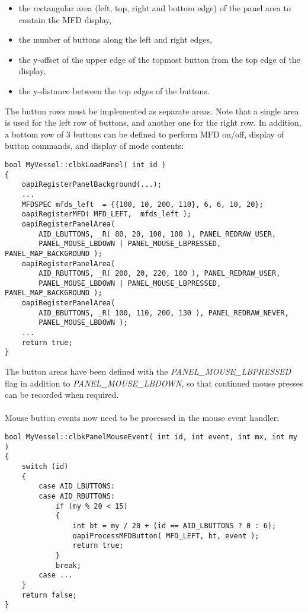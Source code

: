 \documentclass[Orbiter Developer Manual.tex]{subfiles}
\begin{document}
\begin{itemize}
\item the rectangular area (left, top, right and bottom edge) of the panel area to contain the MFD display,
\item the number of buttons along the left and right edges,
\item the y-offset of the upper edge of the topmost button from the top edge of the display,
\item the y-distance between the top edges of the buttons.
\end{itemize}

\noindent
The button rows must be implemented as separate areas. Note that a single area is used for the left row of buttons, and another one for the right row. In addition, a bottom row of 3 buttons can be defined to perform MFD on/off, display of button commands, and display of mode contents:

\begin{lstlisting}
bool MyVessel::clbkLoadPanel( int id )
{
	oapiRegisterPanelBackground(...);
	...
	MFDSPEC mfds_left  = {{100, 10, 200, 110}, 6, 6, 10, 20};
	oapiRegisterMFD( MFD_LEFT,  mfds_left );
	oapiRegisterPanelArea(
		AID_LBUTTONS, _R( 80, 20, 100, 100 ), PANEL_REDRAW_USER,
		PANEL_MOUSE_LBDOWN | PANEL_MOUSE_LBPRESSED, PANEL_MAP_BACKGROUND );
	oapiRegisterPanelArea(
		AID_RBUTTONS, _R( 200, 20, 220, 100 ), PANEL_REDRAW_USER,
		PANEL_MOUSE_LBDOWN | PANEL_MOUSE_LBPRESSED, PANEL_MAP_BACKGROUND );
	oapiRegisterPanelArea(
		AID_BBUTTONS, _R( 100, 110, 200, 130 ), PANEL_REDRAW_NEVER,
		PANEL_MOUSE_LBDOWN );
	...
	return true;
}
\end{lstlisting}

\noindent
The button areas have been defined with the \textit{PANEL\_MOUSE\_LBPRESSED} flag in addition to \textit{PANEL\-\_MOUSE\_LBDOWN}, so that continued mouse presses can be recorded when required.\\
\\
Mouse button events now need to be processed in the mouse event handler:

\begin{lstlisting}
bool MyVessel::clbkPanelMouseEvent( int id, int event, int mx, int my )
{
	switch (id)
	{
		case AID_LBUTTONS:
		case AID_RBUTTONS:
			if (my % 20 < 15)
			{
				int bt = my / 20 + (id == AID_LBUTTONS ? 0 : 6);
				oapiProcessMFDButton( MFD_LEFT, bt, event );
				return true;
			}
			break;
		case ...
	}
	return false;
}
\end{lstlisting}
\end{document}
